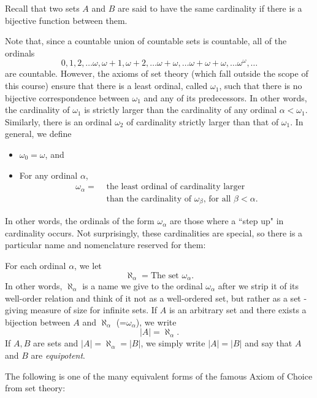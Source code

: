 Recall that two sets $A$ and $B$ are said to have the same cardinality if there is a bijective function between them.

Note that, since a countable union of countable sets is countable, all of the ordinals
\[
  0, 1, 2, \dots \omega, \omega+1,\omega+2,\dots \omega+\omega,\dots \omega+\omega+\omega, \dots \omega^\omega,\dots
\]
are countable.
However,  the axioms of set theory (which fall outside the scope of this course) ensure that there is a least ordinal, called $\omega_1$, such that there is no bijective correspondence between $\omega_1$ and any of its predecessors.
In other words, the cardinality of $\omega_1$ is strictly larger than the cardinality of any ordinal $\alpha<\omega_1$.
Similarly, there is an ordinal $\omega_2$ of cardinality strictly larger than that of $\omega_1$.
In general, we define

\begin{itemize}
\item
  $\omega_0=\omega$, and
\item
  For any ordinal $\alpha$,
  \begin{align*}
  \omega_\alpha = & \text{ the least ordinal of cardinality larger}                         \\
                  & \text{ than the cardinality of $\omega_\beta$, for all $\beta<\alpha$.}
  \end{align*}
\end{itemize}

In other words, the ordinals of the form $\omega_\alpha$ are those where a “step up" in cardinality occurs.
Not surprisingly, these cardinalities are special, so there is a particular name and nomenclature reserved for them:

\begin{definition}
  For each ordinal $\alpha$, we let
  \[
    \aleph_\alpha =\text{The set $\omega_\alpha$}.
  \]
  In other words, $\aleph_\alpha$ is a name we give to the ordinal $\omega_\alpha$ after we strip it of its well-order relation and think of it not as a well-ordered set, but rather as a set - giving measure of size for infinite sets.
  If $A$ is an arbitrary set and there exists a bijection between $A$ and $\aleph_\alpha$ (=$\omega_\alpha$), we write
  \[
    |A|=\aleph_\alpha.
  \]
  If $A, B$ are sets and $|A|=\aleph_\alpha=|B|$, we simply write $|A|=|B|$ and say that $A$ and $B$ are \emph{equipotent}.
\end{definition}

The following is one of the many equivalent forms of  the famous Axiom of Choice from set theory:

